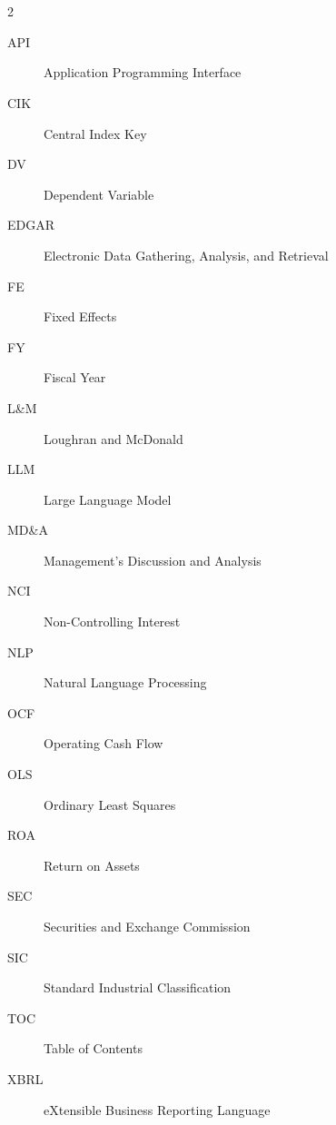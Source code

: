 \chapter*{\SeznamZkratek}

\begin{multicols}{2}
\raggedright
\begin{description}
\item [API] Application Programming Interface
\item [CIK] Central Index Key
\item [DV] Dependent Variable
\item [EDGAR] Electronic Data Gathering, Analysis, and Retrieval
\item [FE] Fixed Effects
\item [FY] Fiscal Year
\item [L\&M] Loughran and McDonald
\item [LLM] Large Language Model
\item [MD\&A] Management's Discussion and Analysis
\item [NCI] Non-Controlling Interest
\item [NLP] Natural Language Processing
\item [OCF] Operating Cash Flow
\item [OLS] Ordinary Least Squares
\item [ROA] Return on Assets
\item [SEC] Securities and Exchange Commission
\item [SIC] Standard Industrial Classification
\item [TOC] Table of Contents
\item [XBRL] eXtensible Business Reporting Language
\end{description}
\end{multicols}
